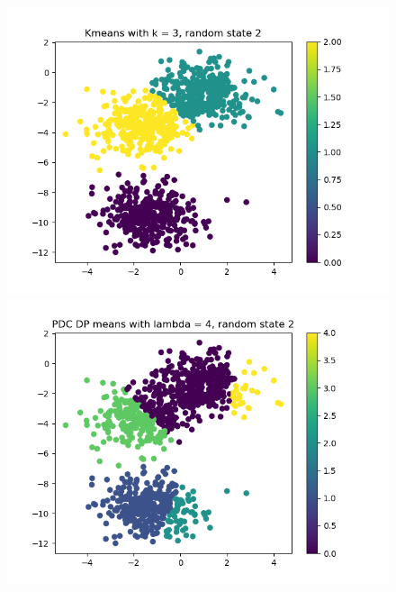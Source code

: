 \documentclass[12pt]{article}
\begin{document}
\newpage
\begin{figure}
    \begin{minipage}{0.5\textwidth}
    \centering
    \includegraphics[scale=0.4]{images/task2_drs_rs2__k3}
    \end{minipage}
    \begin{minipage}{0.5\textwidth}
    \centering
    \includegraphics[scale=0.4]{images/task2_drs_rs2__l4}
    \end{minipage}
    \begin{minipage}{0.5\textwidth}
    \centering

\end{minipage}
\end{figure}
\end{document}

